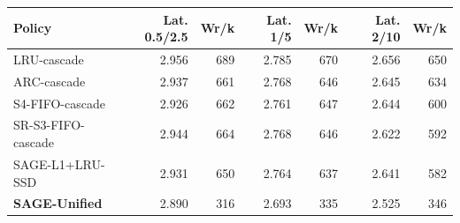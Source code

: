 \begin{tabular}{lrrrrrr}
\toprule
Policy & Lat. 0.5/2.5 & Wr/k & Lat. 1/5 & Wr/k & Lat. 2/10 & Wr/k \\
\midrule
LRU-cascade & 2.956 & 689 & 2.785 & 670 & 2.656 & 650 \\
ARC-cascade & 2.937 & 661 & 2.768 & 646 & 2.645 & 634 \\
S4-FIFO-cascade & 2.926 & 662 & 2.761 & 647 & 2.644 & 600 \\
SR-S3-FIFO-cascade & 2.944 & 664 & 2.768 & 646 & 2.622 & 592 \\
SAGE-L1+LRU-SSD & 2.931 & 650 & 2.764 & 637 & 2.641 & 582 \\
\textbf{SAGE-Unified} & 2.890 & 316 & 2.693 & 335 & 2.525 & 346 \\
\bottomrule
\end{tabular}
